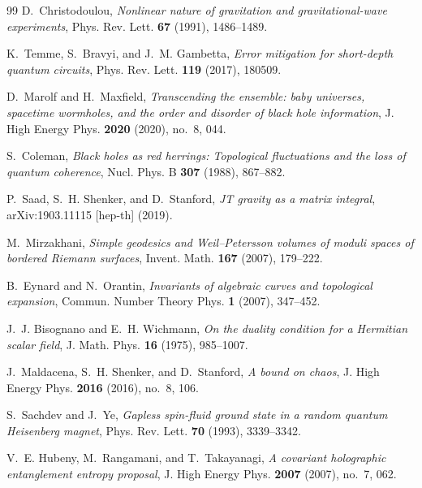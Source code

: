 \documentclass[11pt,a4paper,reqno]{article}
\theoremstyle{plain}
\theoremstyle{definition}
\theoremstyle{remark}
\numberwithin{equation}{section}
\begin{document}
\begin{thebibliography}{99}
D.~Christodoulou, \emph{Nonlinear nature of gravitation and gravitational-wave experiments}, Phys. Rev. Lett. \textbf{67} (1991), 1486--1489.

K.~Temme, S.~Bravyi, and J.~M. Gambetta, \emph{Error mitigation for short-depth quantum circuits}, Phys. Rev. Lett. \textbf{119} (2017), 180509.

D.~Marolf and H.~Maxfield, \emph{Transcending the ensemble: baby universes, spacetime wormholes, and the order and disorder of black hole information}, J. High Energy Phys. \textbf{2020} (2020), no.~8, 044.

S.~Coleman, \emph{Black holes as red herrings: Topological fluctuations and the loss of quantum coherence}, Nucl. Phys. B \textbf{307} (1988), 867--882.

P.~Saad, S.~H. Shenker, and D.~Stanford, \emph{JT gravity as a matrix integral}, arXiv:1903.11115 [hep-th] (2019).

M.~Mirzakhani, \emph{Simple geodesics and Weil--Petersson volumes of moduli spaces of bordered Riemann surfaces}, Invent. Math. \textbf{167} (2007), 179--222.

B.~Eynard and N.~Orantin, \emph{Invariants of algebraic curves and topological expansion}, Commun. Number Theory Phys. \textbf{1} (2007), 347--452.

J.~J. Bisognano and E.~H. Wichmann, \emph{On the duality condition for a Hermitian scalar field}, J. Math. Phys. \textbf{16} (1975), 985--1007.

J.~Maldacena, S.~H. Shenker, and D.~Stanford, \emph{A bound on chaos}, J. High Energy Phys. \textbf{2016} (2016), no.~8, 106.

S.~Sachdev and J.~Ye, \emph{Gapless spin-fluid ground state in a random quantum Heisenberg magnet}, Phys. Rev. Lett. \textbf{70} (1993), 3339--3342.

V.~E. Hubeny, M.~Rangamani, and T.~Takayanagi, \emph{A covariant holographic entanglement entropy proposal}, J. High Energy Phys. \textbf{2007} (2007), no.~7, 062.

\end{thebibliography}
\end{document}
